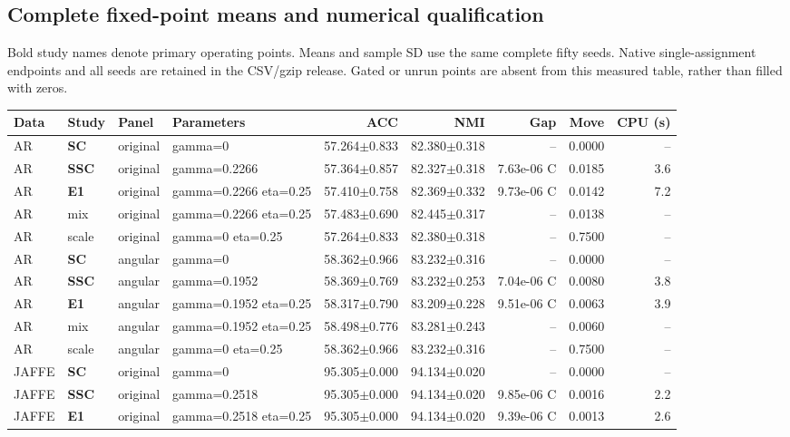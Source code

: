 \subsection{Complete fixed-point means and numerical qualification}
Bold study names denote primary operating points. Means and sample SD use the same complete fifty seeds. Native single-assignment endpoints and all seeds are retained in the CSV/gzip release. Gated or unrun points are absent from this measured table, rather than filled with zeros.
\begingroup\scriptsize\setlength{\tabcolsep}{3pt}
\begin{longtable}{lllp{.14\linewidth}rrrrr}\toprule Data & Study & Panel & Parameters & ACC & NMI & Gap & Move & CPU (s)\\\midrule\endhead
AR & \textbf{SC} & original & gamma=0 & 57.264$\pm$0.833 & 82.380$\pm$0.318 & -- & 0.0000 & --\\
AR & \textbf{SSC} & original & gamma=0.2266 & 57.364$\pm$0.857 & 82.327$\pm$0.318 & 7.63e-06 C & 0.0185 & 3.6\\
AR & \textbf{E1} & original & gamma=0.2266 eta=0.25 & 57.410$\pm$0.758 & 82.369$\pm$0.332 & 9.73e-06 C & 0.0142 & 7.2\\
AR & mix & original & gamma=0.2266 eta=0.25 & 57.483$\pm$0.690 & 82.445$\pm$0.317 & -- & 0.0138 & --\\
AR & scale & original & gamma=0 eta=0.25 & 57.264$\pm$0.833 & 82.380$\pm$0.318 & -- & 0.7500 & --\\
AR & \textbf{SC} & angular & gamma=0 & 58.362$\pm$0.966 & 83.232$\pm$0.316 & -- & 0.0000 & --\\
AR & \textbf{SSC} & angular & gamma=0.1952 & 58.369$\pm$0.769 & 83.232$\pm$0.253 & 7.04e-06 C & 0.0080 & 3.8\\
AR & \textbf{E1} & angular & gamma=0.1952 eta=0.25 & 58.317$\pm$0.790 & 83.209$\pm$0.228 & 9.51e-06 C & 0.0063 & 3.9\\
AR & mix & angular & gamma=0.1952 eta=0.25 & 58.498$\pm$0.776 & 83.281$\pm$0.243 & -- & 0.0060 & --\\
AR & scale & angular & gamma=0 eta=0.25 & 58.362$\pm$0.966 & 83.232$\pm$0.316 & -- & 0.7500 & --\\
JAFFE & \textbf{SC} & original & gamma=0 & 95.305$\pm$0.000 & 94.134$\pm$0.020 & -- & 0.0000 & --\\
JAFFE & \textbf{SSC} & original & gamma=0.2518 & 95.305$\pm$0.000 & 94.134$\pm$0.020 & 9.85e-06 C & 0.0016 & 2.2\\
JAFFE & \textbf{E1} & original & gamma=0.2518 eta=0.25 & 95.305$\pm$0.000 & 94.134$\pm$0.020 & 9.39e-06 C & 0.0013 & 2.6\\

\end{longtable}
